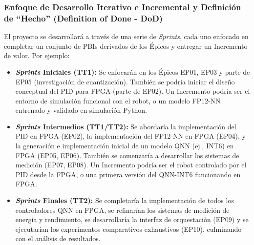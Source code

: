 \documentclass[12pt]{article}
\begin{document}
\subsubsection{Enfoque de Desarrollo Iterativo e Incremental y Definición de ``Hecho'' (Definition of Done - DoD)}
\label{sssec:desarrollo_incremental_dod}

El proyecto se desarrollará a través de una serie de \textit{Sprints}, cada uno enfocado en completar un conjunto de PBIs derivados de los Épicos y entregar un Incremento de valor. Por ejemplo:
\begin{itemize}
    \item \textbf{\textit{Sprints} Iniciales (TT1):} Se enfocarán en los Épicos EP01, EP03 y parte de EP05 (investigación de cuantización). También se podría iniciar el diseño conceptual del PID para FPGA (parte de EP02). Un Incremento podría ser el entorno de simulación funcional con el robot, o un modelo FP12-NN entrenado y validado en simulación Python.
    \item \textbf{\textit{Sprints} Intermedios (TT1/TT2):} Se abordaría la implementación del PID en FPGA (EP02), la implementación del FP12-NN en FPGA (EP04), y la generación e implementación inicial de un modelo QNN (ej., INT6) en FPGA (EP05, EP06). También se comenzaría a desarrollar los sistemas de medición (EP07, EP08). Un Incremento podría ser el robot controlado por el PID desde la FPGA, o una primera versión del QNN-INT6 funcionando en FPGA.
    \item \textbf{\textit{Sprints} Finales (TT2):} Se completaría la implementación de todos los controladores QNN en FPGA, se refinarían los sistemas de medición de energía y rendimiento, se desarrollaría la interfaz de orquestación (EP09) y se ejecutarían los experimentos comparativos exhaustivos (EP10), culminando con el análisis de resultados.
\end{itemize}
\end{document}
